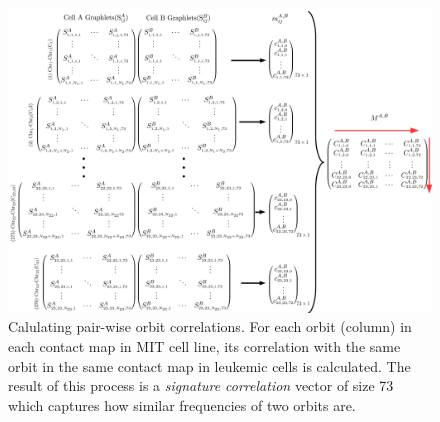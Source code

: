 \documentclass[]{article}
\begin{document}
\begin{figure}
    \centering
    \includegraphics[width=\textwidth]{figures/graphlet_correlation_schema.png}
    \caption{Calulating pair-wise orbit correlations. For each orbit (column)
    in each contact map in MIT cell line, its correlation with the
    same orbit in the same contact map 
    in leukemic cells is calculated. The result of
    this process is a \textit{signature correlation} vector of size
    73 which captures how similar frequencies of two orbits are.}
    \label{graphlet_correlation_schema}
\end{figure}
\end{document}
